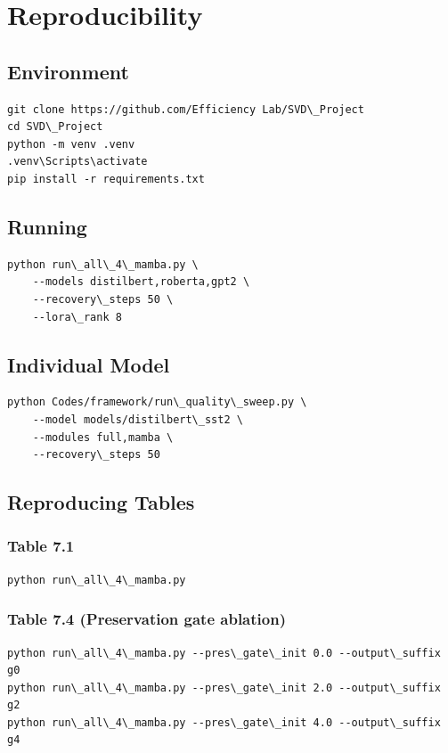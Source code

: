 \section{Reproducibility}

\subsection{Environment}

\begin{lstlisting}
git clone https://github.com/Efficiency Lab/SVD\_Project
cd SVD\_Project
python -m venv .venv
.venv\Scripts\activate
pip install -r requirements.txt
\end{lstlisting}

\subsection{Running}

\begin{lstlisting}
python run\_all\_4\_mamba.py \
    --models distilbert,roberta,gpt2 \
    --recovery\_steps 50 \
    --lora\_rank 8
\end{lstlisting}

\subsection{Individual Model}

\begin{lstlisting}
python Codes/framework/run\_quality\_sweep.py \
    --model models/distilbert\_sst2 \
    --modules full,mamba \
    --recovery\_steps 50
\end{lstlisting}

\subsection{Reproducing Tables}

\subsubsection{Table 7.1}
\begin{lstlisting}
python run\_all\_4\_mamba.py
\end{lstlisting}

\subsubsection{Table 7.4 (Preservation gate ablation)}
\begin{lstlisting}
python run\_all\_4\_mamba.py --pres\_gate\_init 0.0 --output\_suffix g0
python run\_all\_4\_mamba.py --pres\_gate\_init 2.0 --output\_suffix g2
python run\_all\_4\_mamba.py --pres\_gate\_init 4.0 --output\_suffix g4
\end{lstlisting}

